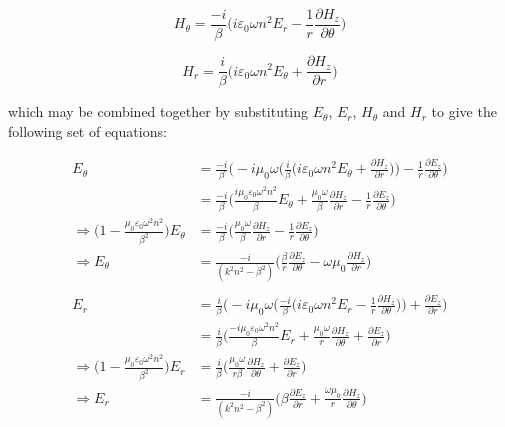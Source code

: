 \documentclass[12pt]{article}
\theoremstyle{definition}
\numberwithin{equation}{section}
\begin{document}
\begin{equation}
H_{\theta}=\frac{-i}{\beta}\bigg(i\varepsilon_{0}\omega n^2 E_r - \frac{1}{r}\frac{\partial H_z}{\partial\theta}\bigg)
\label{TE3.eqn}
\end{equation}

\begin{equation}
H_{r}=\frac{i}{\beta}\bigg(i\varepsilon_{0}\omega n^2 E_{\theta} + \frac{\partial H_z}{\partial r}\bigg)
\label{TE4.eqn}
\end{equation}

which may be combined together by substituting $E_\theta$, $E_r$, $H_\theta$ and $H_r$ to give the following set of equations:

\begin{align}
E_{\theta} &= \frac{-i}{\beta}\bigg(-i\mu_{0}\omega \bigg(\frac{i}{\beta}\bigg(i\varepsilon_{0}\omega n^2 E_{\theta} + \frac{\partial H_z}{\partial r}\bigg) \bigg)-\frac{1}{r}\frac{\partial E_z}{\partial\theta}\bigg)\nonumber
\\&=
\frac{-i}{\beta}\bigg(\frac{i\mu_{0}\varepsilon_{0}\omega^2 n^2}{\beta} E_{\theta} + \frac{\mu_{0}\omega}{\beta}\frac{\partial H_z}{\partial r}-\frac{1}{r}\frac{\partial E_z}{\partial\theta}\bigg)\nonumber
\\ \Rightarrow \bigg(1-\frac{\mu_{0}\varepsilon_{0}\omega^{2} n^2}{\beta^2}\bigg) E_{\theta} &= \frac{-i}{\beta}\bigg(\frac{\mu_0\omega}{\beta}\frac{\partial H_z}{\partial r}-\frac{1}{r}\frac{\partial E_z}{\partial\theta}\bigg)\nonumber
\\ \Rightarrow E_\theta &= \frac{-i}{(k^2 n^2 -\beta^2 )}\bigg(\frac{\beta}{r}\frac{\partial E_z}{\partial\theta}-\omega\mu_0\frac{\partial H_z}{\partial r}\bigg)
\label{TE5.eqn}
\\&\nonumber
\\ E_{r} &= \frac{i}{\beta}\bigg(-i\mu_{0}\omega \bigg(\frac{-i}{\beta}\bigg(i\varepsilon_{0}\omega n^2 E_r - \frac{1}{r}\frac{\partial H_z}{\partial\theta}\bigg)\bigg) +\frac{\partial E_z}{\partial r}\bigg)\nonumber
\\&=\frac{i}{\beta}\bigg(\frac{-i\mu_0\varepsilon_0\omega^2 n^2}{\beta}E_r+\frac{\mu_0\omega}{r}\frac{\partial H_z}{\partial\theta}+\frac{\partial E_z}{\partial r}\bigg)\nonumber
\\ \Rightarrow \bigg(1-\frac{\mu_0\varepsilon_0\omega^2 n^2}{\beta^2}\bigg)E_r &= \frac{i}{\beta}\bigg(\frac{\mu_0\omega}{r\beta}\frac{\partial H_z}{\partial\theta}+\frac{\partial E_z}{\partial r}\bigg)\nonumber
\\ \Rightarrow E_r &= \frac{-i}{(k^2 n^2 -\beta^2 )}\bigg(\beta\frac{\partial E_z}{\partial r} +\frac{\omega\mu_0}{r}\frac{\partial H_z}{\partial\theta}\bigg)
\label{TE6.eqn}
\end{align}
\end{document}
